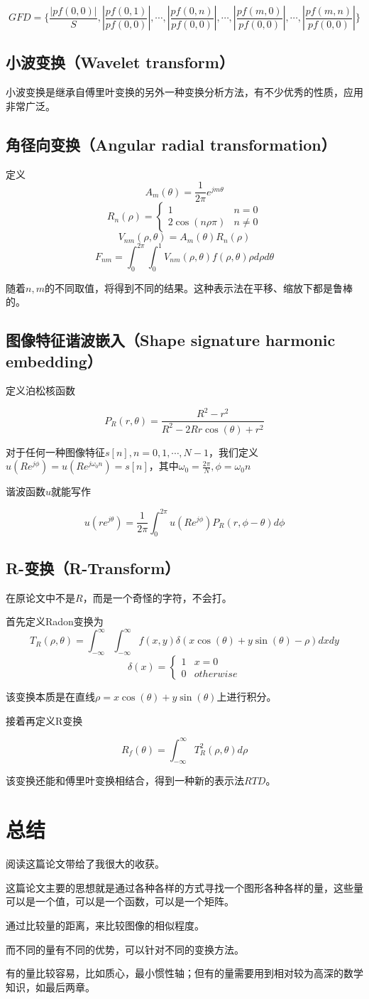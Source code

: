 \documentclass{ctexart}
\begin{document}
\[GFD=\{\frac{|pf(0,0)|}{S},|\frac{pf(0,1)}{pf(0,0)}|,\cdots,|\frac{pf(0,n)}{pf(0,0)}|,\cdots,|\frac{pf(m,0)}{pf(0,0)}|,\cdots,|\frac{pf(m,n)}{pf(0,0)}|\}\]

\subsection{小波变换（Wavelet transform）}
小波变换是继承自傅里叶变换的另外一种变换分析方法，有不少优秀的性质，应用非常广泛。
\subsection{角径向变换（Angular radial transformation）}
定义
\[A_m(\theta)=\frac{1}{2\pi}e^{jm\theta}\]
\[R_n(\rho)=\begin{cases}1 & n=0 \\ 2\cos(n\rho \pi) & n \neq 0\end{cases}\]
\[V_{nm}(\rho,\theta)=A_m(\theta)R_n(\rho)\]
\[F_{nm}=\int_0^{2\pi}\int_0^1V_{nm}(\rho,\theta)f(\rho,\theta)\rho d \rho d \theta\]

随着$n,m$的不同取值，将得到不同的结果。这种表示法在平移、缩放下都是鲁棒的。
\subsection{图像特征谐波嵌入（Shape signature harmonic embedding）}
定义泊松核函数

\[P_R(r,\theta)=\frac{R^2-r^2}{R^2-2Rr\cos(\theta)+r^2}\]

对于任何一种图像特征$s[n],n=0,1,\cdots,N-1$，我们定义$u(Re^{j\phi})=u(Re^{j\omega_0n})=s[n]$，其中$\omega_0=\frac{2\pi}{N},\phi=\omega_0n$

谐波函数$u$就能写作

\[u(re^{j\theta})=\frac{1}{2\pi}\int_0^{2\pi}u(Re^{j\phi})P_R(r,\phi-\theta)d\phi\]

\subsection{R-变换（R-Transform）}
在原论文中不是$R$，而是一个奇怪的字符，不会打。

首先定义Radon变换为
\[T_R(\rho,\theta)=\int_{-\infty}^{\infty}\int_{-\infty}^{\infty}f(x,y)\delta(x\cos(\theta)+y\sin(\theta)-\rho)dxdy\]
\[\delta(x)=\begin{cases}1 & x=0 \\ 0 & otherwise\end{cases}\]

该变换本质是在直线$\rho=x\cos(\theta)+y\sin(\theta)$上进行积分。

接着再定义R变换

\[R_f(\theta)=\int_{-\infty}^{\infty}T_R^2(\rho,\theta)d\rho\]

该变换还能和傅里叶变换相结合，得到一种新的表示法$RTD$。
\section{总结}
阅读这篇论文带给了我很大的收获。

这篇论文主要的思想就是通过各种各样的方式寻找一个图形各种各样的量，这些量可以是一个值，可以是一个函数，可以是一个矩阵。

通过比较量的距离，来比较图像的相似程度。

而不同的量有不同的优势，可以针对不同的变换方法。

有的量比较容易，比如质心，最小惯性轴；但有的量需要用到相对较为高深的数学知识，如最后两章。
\end{document}
